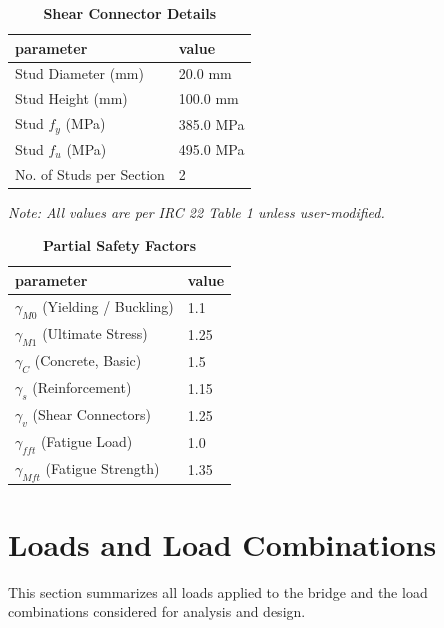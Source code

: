\documentclass[12pt,a4paper]{report}
\numberwithin{table}{chapter}
\numberwithin{figure}{chapter}
\begin{document}
\vspace{0.4em}
\begin{longtable}{|L{5.5cm}|p{10.0cm}|}
\caption{\textbf{Shear Connector Details}}
\hline
\textbf{parameter} & \textbf{value} \\
\hline
\textnormal{Stud Diameter (mm)} & 20.0 mm \\[6pt]
\hline
\textnormal{Stud Height (mm)} & 100.0 mm \\[6pt]
\hline
\textnormal{Stud $f_y$ (MPa)} & 385.0 MPa \\[6pt]
\hline
\textnormal{Stud $f_u$ (MPa)} & 495.0 MPa \\[6pt]
\hline
\textnormal{No. of Studs per Section} & 2 \\[6pt]
\hline
\end{longtable}



\label{subsec:safety-factors}

\vspace{2.2em}

\vspace{0.3em}
\noindent\textit{Note: All values are per IRC 22 Table 1 unless user-modified.}

\vspace{0.4em}
\begin{longtable}{|L{5.5cm}|p{10.0cm}|}
\caption{\textbf{Partial Safety Factors}}
\hline
\textbf{parameter} & \textbf{value} \\
\hline
\textnormal{$\gamma_{M0}$ (Yielding / Buckling)} & 1.1 \\[6pt]
\hline
\textnormal{$\gamma_{M1}$ (Ultimate Stress)} & 1.25 \\[6pt]
\hline
\textnormal{$\gamma_C$ (Concrete, Basic)} & 1.5 \\[6pt]
\hline
\textnormal{$\gamma_s$ (Reinforcement)} & 1.15 \\[6pt]
\hline
\textnormal{$\gamma_v$ (Shear Connectors)} & 1.25 \\[6pt]
\hline
\textnormal{$\gamma_{fft}$ (Fatigue Load)} & 1.0 \\[6pt]
\hline
\textnormal{$\gamma_{Mft}$ (Fatigue Strength)} & 1.35 \\[6pt]
\hline
\end{longtable}


\chapter{Loads and Load Combinations}

This section summarizes all loads applied to the bridge and the load combinations considered for analysis and design.
\end{document}
